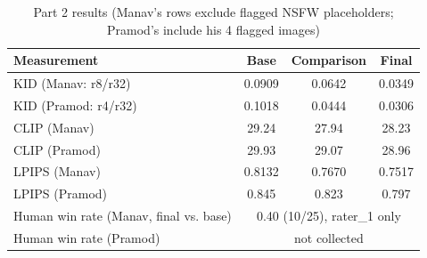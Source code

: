\begin{table}[t]
\caption{Part 2 results (Manav's rows exclude flagged NSFW placeholders; Pramod's include his 4 flagged images)}
\label{tab:p2-results}
\centering\small
\begin{tabular}{lccc}
\toprule
Measurement & Base & Comparison & Final \\
\midrule
KID (Manav: r8/r32) & 0.0909 & 0.0642 & 0.0349 \\
KID (Pramod: r4/r32) & 0.1018 & 0.0444 & 0.0306 \\
CLIP (Manav) & 29.24 & 27.94 & 28.23 \\
CLIP (Pramod) & 29.93 & 29.07 & 28.96 \\
LPIPS (Manav) & 0.8132 & 0.7670 & 0.7517 \\
LPIPS (Pramod) & 0.845 & 0.823 & 0.797 \\
Human win rate (Manav, final vs. base) & \multicolumn{3}{c}{0.40 (10/25), rater\_1 only} \\
Human win rate (Pramod) & \multicolumn{3}{c}{not collected} \\
\bottomrule
\end{tabular}
\end{table}
